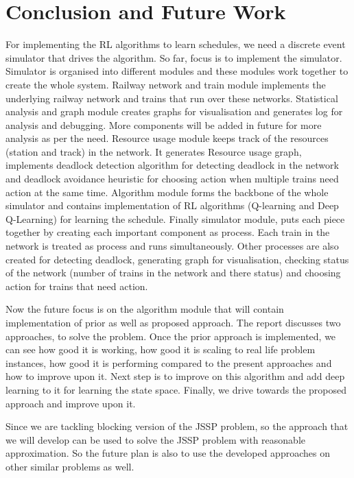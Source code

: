 \chapter{Conclusion and Future Work}

For implementing the RL algorithms to learn schedules, we need a discrete event simulator 
that drives the algorithm. So far, focus is to implement the simulator. Simulator is organised into different modules 
and these modules work together to create the whole system. Railway network and train module implements 
the underlying railway network and trains that run over these networks. Statistical analysis and graph module 
creates graphs for visualisation and generates log for analysis and debugging. More components 
will be added in future for more analysis as per the need. Resource usage module 
keeps track of the resources (station and track) in the network. It generates Resource usage graph, 
implements deadlock detection algorithm for detecting deadlock in the network and deadlock avoidance heuristic for choosing action when multiple
trains need action at the same time. Algorithm module forms the backbone of the whole simulator and contains 
implementation of RL algorithms (Q-learning and Deep Q-Learning) for learning the 
schedule. Finally simulator module, puts each piece together by creating each important 
component as process. Each train in the network is treated as process and runs simultaneously.
Other processes are also created for detecting deadlock, generating graph for visualisation,
checking status of the network (number of trains in the network and there status) and choosing 
action for trains that need action. 

\vspace{\baselineskip}
Now the future focus is on the algorithm module that will contain implementation of 
prior as well as proposed approach. The report discusses
two approaches, to solve the problem. Once the prior approach is implemented, we can
see how good it is working, how good it is scaling to real life problem instances, how good it is 
performing compared to the present approaches and how to improve upon it. Next step is to 
improve on this algorithm and add deep learning to it for learning the state space. Finally, 
we drive towards the proposed approach and improve upon it.  

\vspace{\baselineskip}
Since we are tackling blocking version of the JSSP problem, so the approach that we will 
develop can be used to solve the JSSP problem with reasonable approximation. So the future plan is also 
to use the developed approaches on other similar problems as well.
